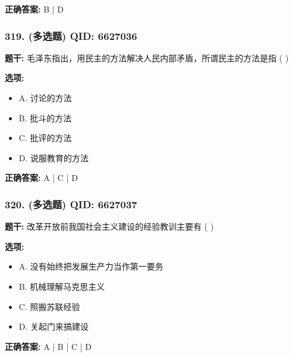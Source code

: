 \documentclass[12pt,UTF8]{ctexart}
\begin{document}
\textbf{正确答案:}
B | D

\vspace{0.3em}\hrulefill\vspace{0.7em}

\subsubsection*{319. (多选题) \small QID: 6627036}

\textbf{题干:}
毛泽东指出，用民主的方法解决人民内部矛盾，所谓民主的方法是指  ( )

\textbf{选项:}
\begin{itemize}[leftmargin=*]

  \item A. 讨论的方法

  \item B. 批斗的方法

  \item C. 批评的方法

  \item D. 说服教育的方法

\end{itemize}

\textbf{正确答案:}
A | C | D

\vspace{0.3em}\hrulefill\vspace{0.7em}

\subsubsection*{320. (多选题) \small QID: 6627037}

\textbf{题干:}
改革开放前我国社会主义建设的经验教训主要有  ( )

\textbf{选项:}
\begin{itemize}[leftmargin=*]

  \item A. 没有始终把发展生产力当作第一要务

  \item B. 机械理解马克思主义

  \item C. 照搬苏联经验

  \item D. 关起门来搞建设

\end{itemize}

\textbf{正确答案:}
A | B | C | D

\vspace{0.3em}\hrulefill\vspace{0.7em}
\end{document}
